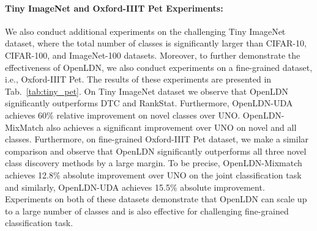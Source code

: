 \documentclass[runningheads]{eccv2022submission}
\begin{document}
\begin{table}[t]
\vspace{2mm}
\begin{center}\setlength{\tabcolsep}{2pt}
\small
\resizebox{0.9\textwidth}{!}{\begin{tabular}{lcccccc}
\hline

\hline

\hline\-3mm]
\\
 \hline

\hline

\hline
DTC~\cite{han2019learning} &  &  &  &  &  &  \\
RankStats~\cite{Han2020Automatically} & &  &  &  &  &  \\
UNO~\cite{fini2021unified} &   &  &  &  &  & \\ 
\rowcolor[gray]{.95} {OpenLDN-MixMatch} &  &  &  & {\tiny{\textcolor{teal}{}}} &  & \\ 
\rowcolor[gray]{.95} {OpenLDN-UDA} & {\tiny{\textcolor{teal}{}}} & {\tiny{\textcolor{teal}{}}} & {\tiny{\textcolor{teal}{}}} &  & {\tiny{\textcolor{teal}{}}} & {\tiny{\textcolor{teal}{}}}\\ \hline 

\hline

\hline
\end{tabular}
}
\end{center}
\caption{\small Accuracy on \textbf{Tiny ImageNet} and \textbf{Oxford-IIIT Pet} datasets with 50\% classes as known and 50\% classes as novel.}
\label{tab:tiny_pet}
\vspace{-8mm}
\end{table}


\vspace{-2mm}
\paragraph{\textbf{Tiny ImageNet and Oxford-IIIT Pet Experiments:}} We also conduct additional experiments on the challenging Tiny ImageNet dataset, where the total number of classes is significantly larger than CIFAR-10, CIFAR-100, and ImageNet-100 datasets. Moreover, to further demonstrate the effectiveness of OpenLDN, we also conduct experiments on a fine-grained dataset, i.e., Oxford-IIIT Pet. The results of these experiments are presented in Tab.~\ref{tab:tiny_pet}. On Tiny ImageNet dataset we observe that OpenLDN significantly outperforms DTC and RankStat. Furthermore, OpenLDN-UDA achieves 60\% relative improvement on novel classes over UNO. OpenLDN-MixMatch also achieves a significant improvement over UNO on novel and all classes. Furthermore, on fine-grained Oxford-IIIT Pet dataset, we make a similar comparison and observe that OpenLDN significantly outperforms all three novel class discovery methods by a large margin. To be precise, OpenLDN-Mixmatch achieves 12.8\% absolute improvement over UNO on the joint classification task and similarly, OpenLDN-UDA achieves 15.5\% absolute improvement. Experiments on both of these datasets demonstrate that OpenLDN can scale up to a large number of classes and is also effective for challenging fine-grained classification task.      
\end{document}
